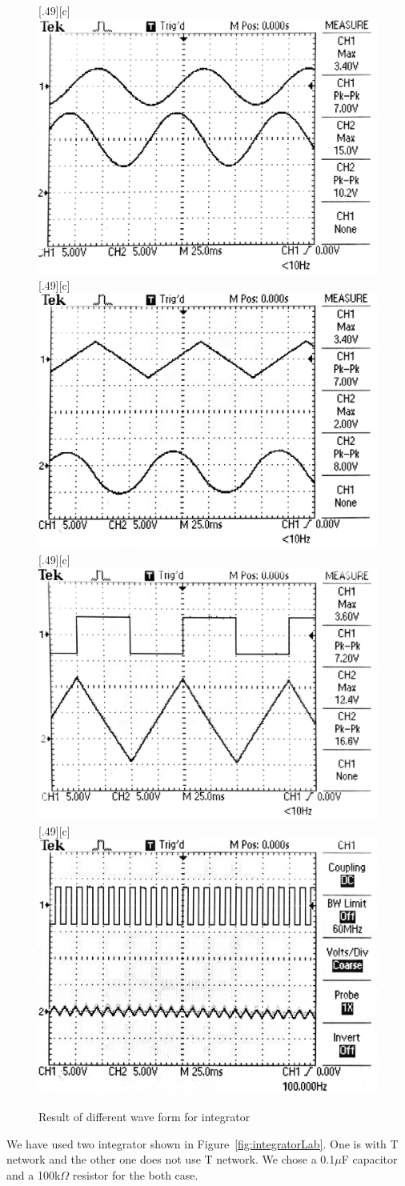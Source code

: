 \documentclass[aps,prl,reprint]{revtex4-1}
\begin{document}
        \begin{figure}[b]
            \centering
            [.49\linewidth][c]{%
                \includegraphics[width=.49\linewidth]{image/integrator/sine.pdf}}
            [.49\linewidth][c]{%
                \includegraphics[width=.49\linewidth]{image/integrator/tri.pdf}}
            [.49\linewidth][c]{%
                \includegraphics[width=.49\linewidth]{image/integrator/sqr.pdf}}
            [.49\linewidth][c]{%
                \includegraphics[width=.49\linewidth]{image/integrator/highFre.pdf}}
            \caption{Result of different wave form for integrator}
            \label{fig:integratorWave}
        \end{figure}
        We have used two integrator shown in Figure~\ref{fig:integratorLab}. One is with T network and the other one does not use T network. We chose a 0.1$\mu$F capacitor and a 100k$\Omega$ resistor for the both case.
\end{document}
